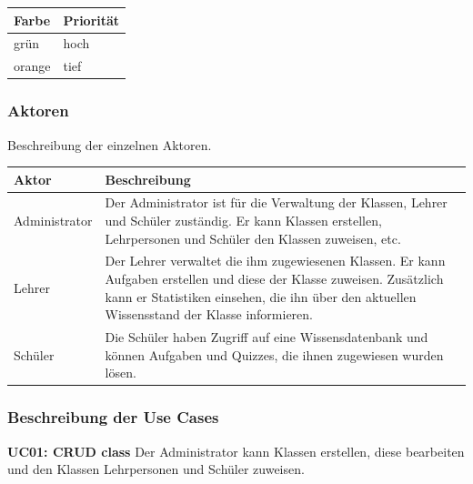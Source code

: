 \begin{tabular}{| p{1cm} | p{1.3cm}|}
	\hline
	\textbf{Farbe} & \textbf{Priorität} \\
	\hline	
	grün & hoch \\
	\hline
	orange & tief \\
	\hline
\end{tabular}


\subsubsection{Aktoren}
Beschreibung der einzelnen Aktoren.
\newline
\begin{tabularx}{\textwidth}{| X | X |}
	\hline
		\textbf{Aktor} & \textbf{Beschreibung} \\
	\hline
		Administrator & Der Administrator ist für die Verwaltung der Klassen, Lehrer und Schüler zuständig. Er kann Klassen erstellen, Lehrpersonen und Schüler den Klassen zuweisen, etc. \\
	\hline
		Lehrer & Der Lehrer verwaltet die ihm zugewiesenen Klassen. Er kann Aufgaben erstellen und diese der Klasse zuweisen. Zusätzlich kann er Statistiken einsehen, die ihn über den aktuellen Wissensstand der Klasse informieren. \\
	\hline
		Schüler & Die Schüler haben Zugriff auf eine Wissensdatenbank und können Aufgaben und Quizzes, die ihnen zugewiesen wurden lösen. \\
	\hline
\end{tabularx}


\subsubsection{Beschreibung der Use Cases}

\textbf{UC01: CRUD class} Der Administrator kann Klassen erstellen, diese bearbeiten und den Klassen Lehrpersonen und Schüler zuweisen.

